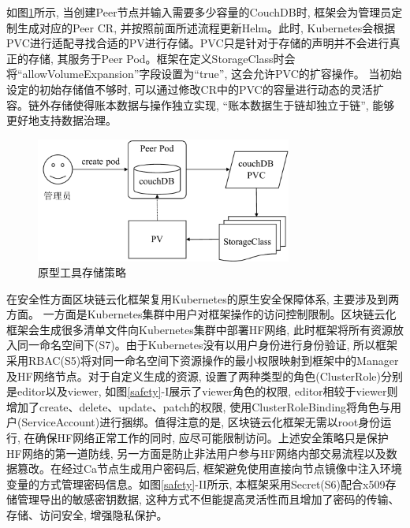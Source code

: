 如图\ref{pvc_sc}所示, 当创建Peer节点并输入需要多少容量的CouchDB时, 框架会为管理员定制生成对应的Peer CR, 并按照前面所述流程更新Helm。此时, Kubernetes会根据PVC进行适配寻找合适的PV进行存储。PVC只是针对于存储的声明并不会进行真正的存储, 其服务于Peer Pod。框架在定义StorageClass时会将“allowVolumeExpansion”字段设置为“true”, 这会允许PVC的扩容操作。 当初始设定的初始存储值不够时, 可以通过修改CR中的PVC的容量进行动态的灵活扩容。链外存储使得账本数据与操作独立实现, “账本数据生于链却独立于链”, 能够更好地支持数据治理。

\begin{figure}[h] %
    \centering %
    \includegraphics[width=0.75\textwidth]{FIGs/chapter5/pvc_sc.pdf} %
    \caption{原型工具存储策略} %
    \label{pvc_sc} %
\end{figure}%

在安全性方面区块链云化框架复用Kubernetes的原生安全保障体系, 主要涉及到两方面。 一方面是Kubernetes集群中用户对框架操作的访问控制限制。区块链云化框架会生成很多清单文件向Kubernetes集群中部署HF网络, 此时框架将所有资源放入同一命名空间下(S7)。由于Kubernetes没有以用户身份进行身份验证, 所以框架采用RBAC(S5)将对同一命名空间下资源操作的最小权限映射到框架中的Manager及HF网络节点。对于自定义生成的资源, 设置了两种类型的角色(ClusterRole)分别是editor以及viewer, 如图\ref{safety}-I展示了viewer角色的权限, editor相较于viewer则增加了create、delete、update、patch的权限, 使用ClusterRoleBinding将角色与用户(ServiceAccount)进行捆绑。值得注意的是, 区块链云化框架无需以root身份运行, 在确保HF网络正常工作的同时, 应尽可能限制访问。上述安全策略只是保护HF网络的第一道防线, 另一方面是防止非法用户参与HF网络内部交易流程以及数据篡改。在经过Ca节点生成用户密码后, 框架避免使用直接向节点镜像中注入环境变量的方式管理密码信息。如图\ref{safety}-II所示, 本框架采用Secret(S6)配合x509\cite{8249485}存储管理导出的敏感密钥数据, 这种方式不但能提高灵活性而且增加了密码的传输、存储、访问安全, 增强隐私保护。

